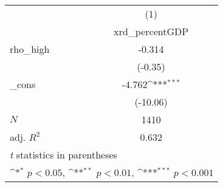 {
\def\sym#1{\ifmmode^{#1}\else\(^{#1}\)\fi}
\begin{tabular}{l*{1}{c}}
\toprule
            &\multicolumn{1}{c}{(1)}\\
            &\multicolumn{1}{c}{xrd\_percentGDP}\\
\midrule
rho\_high    &      -0.314         \\
            &     (-0.35)         \\
\addlinespace
\_cons      &      -4.762\sym{***}\\
            &    (-10.06)         \\
\midrule
\(N\)       &        1410         \\
adj. \(R^{2}\)&       0.632         \\
\bottomrule
\multicolumn{2}{l}{\footnotesize \textit{t} statistics in parentheses}\\
\multicolumn{2}{l}{\footnotesize \sym{*} \(p<0.05\), \sym{**} \(p<0.01\), \sym{***} \(p<0.001\)}\\
\end{tabular}
}
